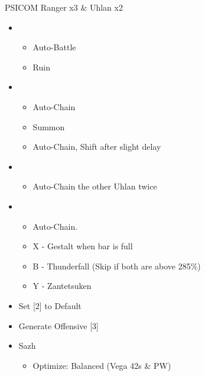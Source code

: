 \begin{multicols}{2}
	\begin{battle}[0:35]{PSICOM Ranger x3 \& Uhlan x2}
		\begin{itemize}
			\item \second
			      \begin{itemize}
				      \item Auto-Battle
				      \item Ruin
			      \end{itemize}
			\item \fourth
			      \begin{itemize}
				      \item Auto-Chain
				      \item Summon
				      \item Auto-Chain, Shift after slight delay
			      \end{itemize}
			\item \fifth
			      \begin{itemize}
				      \item Auto-Chain the other Uhlan twice
			      \end{itemize}
			\item \fourth
			      \begin{itemize}
				      \item Auto-Chain.
				      \item X - Gestalt when bar is full
				      \item B - Thunderfall (Skip if both are above 285\%)
				      \item Y - Zantetsuken
			      \end{itemize}
		\end{itemize}
		 
	\end{battle}



	\begin{menu}
		\begin{itemize}
			\paradigm
			\begin{itemize}
				\item Set [2] to Default
				\item Generate Offensive [3]
			\end{itemize}
			\equip
			\begin{itemize}
				\item Sazh
				      \begin{itemize}
					      \item Optimize: Balanced (Vega 42s \& PW)
				      \end{itemize}
			\end{itemize}
		\end{itemize}
	\end{menu}
	\vfill


\end{multicols}
